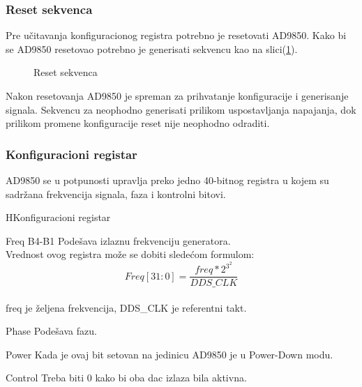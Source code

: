 \subsubsection{Reset sekvenca}
Pre učitavanja konfiguracionog registra potrebno je resetovati AD9850.
Kako bi se AD9850 resetovao potrebno je generisati sekvencu kao na slici(\ref{ad9850_rst_seq}). \\

\begin{figure}[H]
  \centering{
    \scalebox{1.2}{
      
    }}
  \caption{Reset sekvenca}
  \label{ad9850_rst_seq}
\end{figure}

Nakon resetovanja AD9850 je spreman za prihvatanje konfiguracije i generisanje signala.
Sekvencu za neophodno generisati prilikom uspostavljanja napajanja, dok prilikom promene
konfiguracije reset nije neophodno odraditi.

\subsubsection{Konfiguracioni registar}

AD9850 se u potpunosti upravlja preko jedno 40-bitnog registra u kojem su
sadržana frekvencija signala, faza i kontrolni bitovi.

\begin{register}{H}{Konfiguracioni registar}{}%
  \label{example}%
   \\
  \begin{regdesc}\begin{reglist}
    \item [Freq B4-B1] Podešava izlaznu frekvenciju generatora.\\
      Vrednost ovog registra može se dobiti sledećom formulom:
      \[
      Freq [31:0] = \frac{freq*2^3^2}{DDS\_CLK}
      \] \\
      freq je željena frekvencija, DDS\_CLK je referentni takt.
    \item [Phase] Podešava fazu.
    \item [Power] Kada je ovaj bit setovan na jedinicu AD9850 je u Power-Down modu.
    \item [Control] Treba biti 0 kako bi oba \gls{dac} izlaza bila aktivna.
    \end{reglist}\end{regdesc}
\end{register}


